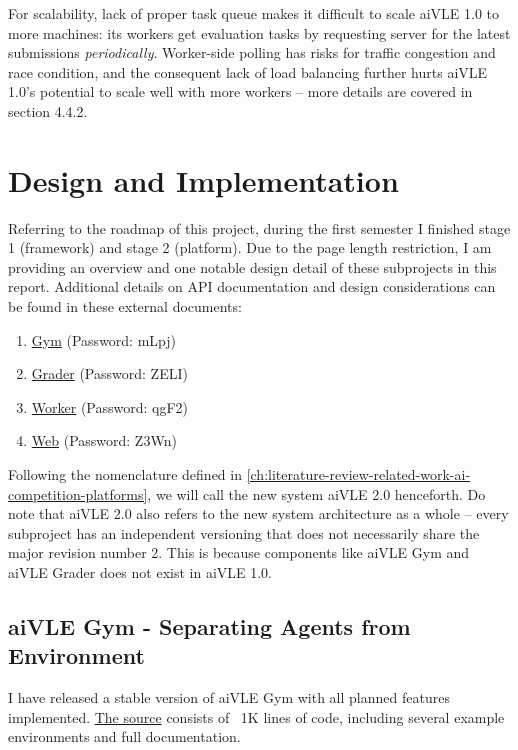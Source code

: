\documentclass[fyp]{socreport}
\begin{document}
For scalability, lack of proper task queue makes it difficult to scale aiVLE 1.0 to more machines: its workers get evaluation tasks by requesting server for the latest submissions \textit{periodically}. Worker-side polling has risks for traffic congestion and race condition, and the consequent lack of load balancing further hurts aiVLE 1.0’s potential to scale well with more workers – more details are covered in section 4.4.2.


\chapter{Design and Implementation}
\label{ch:design-and-impl}
Referring to the roadmap of this project, during the first semester I finished stage 1 (framework) and stage 2 (platform). Due to the page length restriction, I am providing an overview and one notable design detail of these subprojects in this report. Additional details on API documentation and design considerations can be found in these external documents:
\begin{enumerate}
    \item \href{https://yuanhong.larksuite.com/docs/docusSYdnLXZBojin39b8DGzKMT}{Gym} (Password: mLpj)
    \item \href{https://yuanhong.larksuite.com/docs/docuseeHRJWAMV3p3uL7yYCOeYx}{Grader} (Password: ZELI)
    \item \href{https://yuanhong.larksuite.com/docs/docussD8ik4yBXShA5kPyRGhgdg}{Worker} (Password: qgF2)
    \item \href{https://yuanhong.larksuite.com/docs/docusfWZk1oYG8qkEMG7y2oxkye}{Web} (Password: Z3Wn)
\end{enumerate}

Following the nomenclature defined in \ref{ch:literature-review-related-work-ai-competition-platforms}, we will call the new system aiVLE 2.0 henceforth. Do note that aiVLE 2.0 also refers to the new system architecture as a whole – every subproject has an independent versioning that does not necessarily share the major revision number 2. This is because components like aiVLE Gym and aiVLE Grader does not exist in aiVLE 1.0.

\section{aiVLE Gym - Separating Agents from Environment}
\label{ch:aivle-gym}
I have released a stable version of aiVLE Gym with all planned features implemented. \href{https://github.com/edu-ai/aivle-gym}{The source} consists of ~1K lines of code, including several example environments and full documentation.
\end{document}
